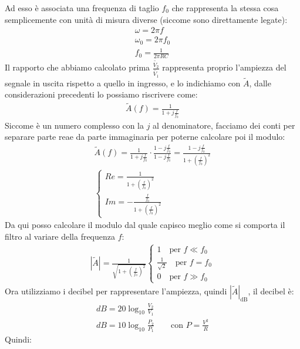 \documentclass[a4paper, oneside]{article}
\begin{document}
Ad esso è associata una frequenza di taglio $f_0$ che rappresenta la stessa cosa semplicemente con unità di misura diverse (siccome sono direttamente legate):
\begin{gather*}
    \omega = 2 \pi f\\
    \omega_0 = 2 \pi f_0\\
    f_0 = \frac{1}{2 \pi R C}
\end{gather*}
Il rapporto che abbiamo calcolato prima $\frac{\widetilde{V_2}}{\widetilde{V_1}}$ rappresenta proprio l'ampiezza del segnale in uscita rispetto a quello in ingresso, e lo indichiamo con $\widetilde{A}$, dalle considerazioni precedenti lo possiamo riscrivere come:
\begin{gather*}
    \widetilde{A} (f) = \frac{1}{1+ j \frac{f}{f_0}}
\end{gather*}
Siccome è un numero complesso con la $j$ al denominatore, facciamo dei conti per separare parte reae da parte immaginaria per poterne calcolare poi il modulo:
\begin{gather*}
    \widetilde{A} (f) = \frac{1}{1 + j \frac{f}{f_0}} \cdot \frac{1 - j \frac{f}{f_0}}{1 - j \frac{f}{f_0}} = \frac{1 - j \frac{f}{f_0}}{1 + (\frac{f}{f_0})^2}\\
    \begin{cases}
        Re = \frac{1}{1+ (\frac{f}{f_0})^2}\\
        Im = - \frac{\frac{f}{f_0}}{1 + (\frac{f}{f_0})^2}
    \end{cases}
\end{gather*}
Da qui posso calcolare il modulo dal quale capisco meglio come si comporta il filtro al variare della frequenza $f$:
\begin{gather*}
    |\widetilde{A}| = \frac{1}{\sqrt{1 + (\frac{f}{f_0})^2}} \begin{cases}
        1 \quad \text{per } f \ll f_0\\
        \frac{1}{\sqrt{2}} \quad \text{per } f = f_0\\
        0 \quad \text{per } f \gg f_0
    \end{cases}
\end{gather*}
Ora utilizziamo i decibel per rappresentare l'ampiezza, quindi $|\widetilde{A}|_\text{dB}$, il decibel è:
\begin{gather*}
    dB = 20 \log_{10} \frac{V_2}{V_1}\\
    dB = 10 \log_{10} \frac{P_2}{P_1} \qquad \text{con } P = \frac{V^2}{R}
\end{gather*}
Quindi:
\end{document}
